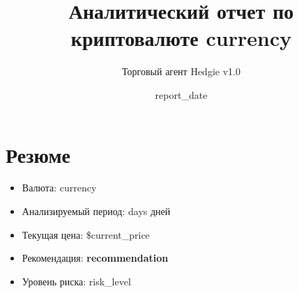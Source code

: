 \documentclass{article}
\title{Аналитический отчет по криптовалюте {{currency}}}
\author{Торговый агент Hedgie v1.0}
\date{{{report_date}}}
\begin{document}
\maketitle

\section{Резюме}
\begin{itemize}
    \item Валюта: {{currency}}
    \item Анализируемый период: {{days}} дней
    \item Текущая цена: \${{current_price}}
    \item Рекомендация: \textbf{{{recommendation}}}
    \item Уровень риска: {{risk_level}}
\end{itemize}
\end{document}
